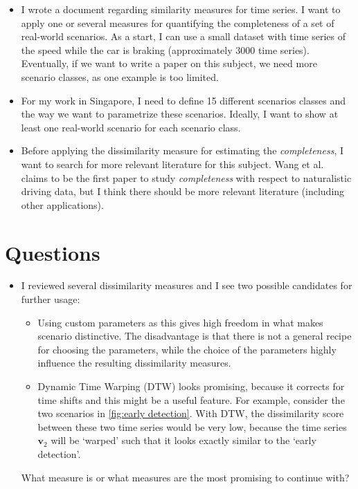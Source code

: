 \documentclass[10pt,final,a4paper,oneside,onecolumn]{article}
\begin{document}
\begin{itemize}
	\item I wrote a document regarding similarity measures for time series. I want to apply one or several measures for quantifying the completeness of a set of real-world scenarios. As a start, I can use a small dataset with time series of the speed while the car is braking (approximately 3000 time series). Eventually, if we want to write a paper on this subject, we need more scenario classes, as one example is too limited.
	\item For my work in Singapore, I need to define 15 different scenarios classes and the way we want to parametrize these scenarios. Ideally, I want to show at least one real-world scenario for each scenario class.
	\item Before applying the dissimilarity measure for estimating the \emph{completeness}, I want to search for more relevant literature for this subject. Wang et al.~\cite{wang2017much} claims to be the first paper to study \emph{completeness} with respect to naturalistic driving data, but I think there should be more relevant literature (including other applications).
\end{itemize}

\section{Questions}

\begin{itemize}
	\item I reviewed several dissimilarity measures and I see two possible candidates for further usage:
	\begin{itemize}
		\item Using custom parameters as this gives high freedom in what makes scenario distinctive. The disadvantage is that there is not a general recipe for choosing the parameters, while the choice of the parameters highly influence the resulting dissimilarity measures.
		\item Dynamic Time Warping (DTW) looks promising, because it corrects for time shifts and this might be a useful feature. For example, consider the two scenarios in \cref{fig:early detection}. With DTW, the dissimilarity score between these two time series would be very low, because the time series $\textbf{v}_2$ will be `warped' such that it looks exactly similar to the `early detection'.
	\end{itemize}
	What measure is or what measures are the most promising to continue with?
\end{itemize}
\end{document}
